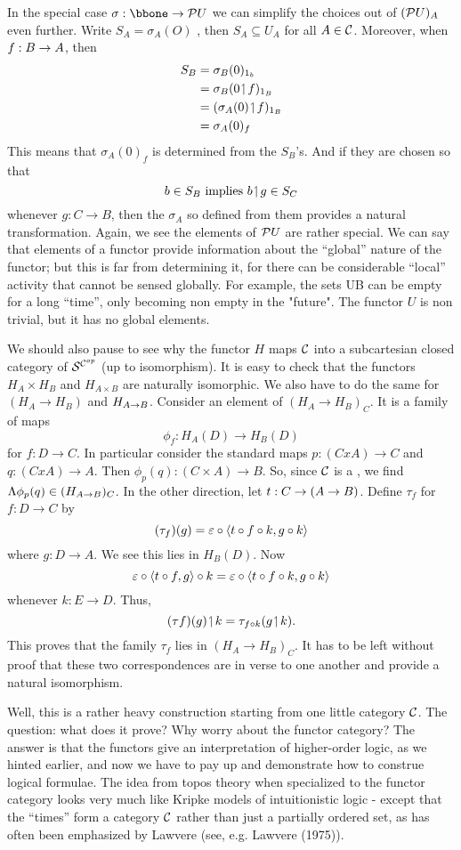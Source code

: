In the special case $\sigma :\bbone \to \PU$ we can simplify the choices
out of $(\mathcal P U)_A$ even further. Write $S_A= \sigma_A(O)$ , then $S_A\subseteq U_A$ for all $A \in \mathcal C$. Moreover, when $f: B \rightarrow A$, then
\begin{align*}
S_B &= \sigma_B(0)_{{\textrm 1}_b}\\
&= \sigma_B(0 \!\upharpoonleft\! f)_{{\textrm 1} _B}\\
&= (\sigma_A(0) \!\upharpoonleft\! f)_{{\textrm 1} _B}\\
&= \sigma_A(0)_f
\end{align*}
This means that $\sigma_A(0)_f$ is determined from the $S_B$'s. And if they are chosen so that
$$
b \in S_B {\textrm{ implies }} b \!\upharpoonleft\! g \in S_C
$$
whenever $g: C\to B$, then the $\sigma_A$ so defined from them provides a
natural transformation. Again, we see the elements of $\mathcal P U$ are rather special. We can say that elements of a functor provide
information about the ``global'' nature of the functor; but this is far from determining it, for there can be considerable ``lo­cal'' activity that cannot be sensed globally. For example, the sets UB can be empty for a long ``time'', only becoming non­ empty in the "future". The functor $U$ is non trivial, but it has no global elements.

We should also pause to see why the functor $H$ maps $\mathcal C$ into a 
subcartesian closed category of $\mathcal S^{\mathcal C^{op}}$ (up to isomorphism). It
is easy to check that the functors $H_A \times H_B$ and $H_{A \times B}$ are naturally isomorphic. We also have to do the same for $(H_A \to H_B)$ and $H_{A \rightarrow B}$. Consider an element of $(H_A\to H_B)_C$. It is a family of maps
$$
\phi_f : H_A(D) \to H_B(D)
$$
for $f: D\to C$. In particular consider the standard maps
$p:	(C x A) \to C$ and $q : (C x A)\to A$. 
Then $\phi_p(q) : (C \times A)\to B$.
So, since $\mathcal C$ is a \ccc, we find $\Lambda\phi_p(q) \in (H_{A \rightarrow B})_C$. In the
other direction, let $t : C\rightarrow (A \rightarrow B)$.
Define $\tau_f$ for $f : D\to C$ by
$$
(\tau_f)(g) = \varepsilon \circ \langle t \circ f \circ k, g \circ k \rangle
$$
where $g : D \to A$. We see this lies in $H_B(D)$. Now
$$
\varepsilon \circ \langle t \circ f, g\rangle \circ k = \varepsilon \circ \langle t \circ f \circ k, g \circ k\rangle
$$
whenever $k: E \to D$. Thus,
$$
(\tau f)(g) \!\upharpoonleft\! k = \tau_{f \circ k}(g \!\upharpoonleft\! k).
$$
This proves that the family $\tau_f$ lies in $(H_A \to H_B)_C$. It has to be left without proof that these two correspondences are in­ verse to one another and provide a natural isomorphism.

Well, this is a rather heavy construction starting from one little category $\mathcal C$. The question: what does it prove? Why worry about the functor category? The answer is that the func­tors give an interpretation of higher-order logic, as we hinted earlier, and now we have to pay up and demonstrate
how to con­strue logical formulae. The idea from topos theory when spe­cialized to the functor category looks very much like Kripke models of intuitionistic logic - except that the ``times'' form a category $\mathcal C$ rather than just a partially ordered set, as has often been emphasized by Lawvere (see, e.g. Lawvere (1975)).


